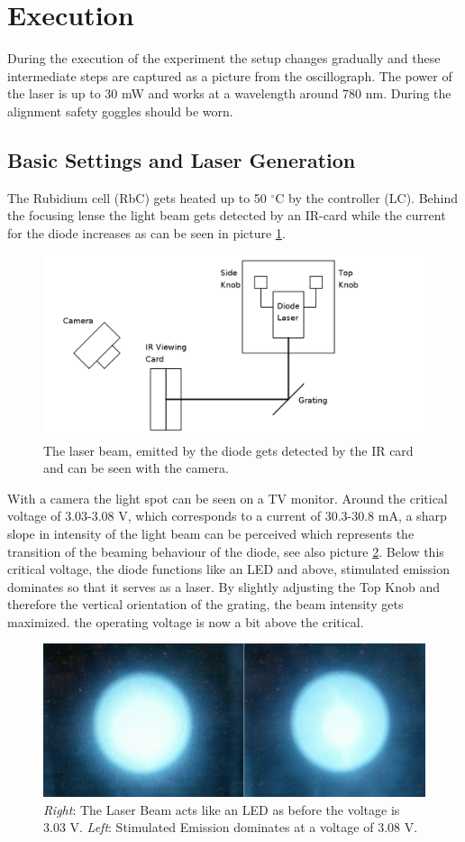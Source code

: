 \section{Execution}
During the execution of the experiment the setup changes gradually and these intermediate steps are captured as a picture from the oscillograph. The power
of the laser is up to 30 mW and works at a wavelength around 780 nm. During the alignment safety goggles should be worn.
\subsection{Basic Settings and Laser Generation}
The Rubidium cell (RbC) gets heated up to 50 $^\circ$C by the controller (LC). Behind the focusing lense the light beam gets detected by an IR-card while
the current for the diode increases as can be seen in picture \ref{pic_setup1}. 
\begin{figure}[t]
 \includegraphics[width=\textwidth]{../pics/setup1.png}
 \caption{The laser beam, emitted by the diode gets detected by the IR card and can be seen with the camera.}
 \label{pic_setup1}
\end{figure}
With a camera the light spot can be seen on a TV monitor. Around the critical
voltage of 3.03-3.08 V, which corresponds to a current of 30.3-30.8 mA, a sharp slope in intensity of the light beam can be perceived which represents the transition of the beaming behaviour of the diode,
see also picture \ref{pic_stains}.
Below this critical voltage, the diode functions like an LED and above, stimulated emission dominates so that it serves as a laser. By slightly adjusting
the Top Knob and therefore the vertical orientation of the grating, the beam intensity gets maximized. the operating voltage is now a bit above the critical.
\begin{figure}
 \includegraphics[width=\textwidth]{../pics/stains.jpg}
 \caption{\textit{Right}: The Laser Beam acts like an LED as before the voltage is 3.03 V. \textit{Left}: Stimulated Emission dominates at a voltage of
 3.08 V.}
 \label{pic_stains}
\end{figure}


